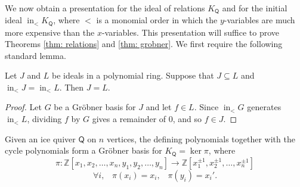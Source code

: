 \documentclass[ALCO,published]{cedram}
\numberwithin{equation}{section}
\DeclareMathOperator{\In}{\mathrm{in}}
\newcommand{\1}{^{-1}}
\def\ZZ{\mathbb{Z}}
\def\Q{\mathsf{Q}}
\begin{document}
\\ 
\indent We now obtain a presentation for the ideal of relations $K_\Q$ and for the initial ideal $\In_< K_\Q$, where $<$ is a monomial order in which the $y$-variables are much more expensive than the $x$-variables.
This presentation will suffice to prove Theorems \ref{thm: relations} and \ref{thm: grobner}. We first require the following standard lemma.
\begin{lem}\label{basislemma}
Let $J$ and $L$ be ideals in a polynomial ring. Suppose that $J \subseteq L$ and $\In_< J  = \In_< L$. Then $J = L$.
\end{lem}
\begin{proof}
Let $G$ be a Gr\"obner basis for $J$ and let $f \in L$. Since $\In_< G$ generates $\In_< L$, dividing $f$ by $G$ gives a remainder of $0$, and so $f \in J$.
\end{proof}
\begin{thm}\label{basisthm}
Given an ice quiver $\Q$ on $n$ vertices, the defining polynomials together with the cycle polynomials form a Gr\"obner basis for $K_\Q = \ker \pi$, where
\[ \pi :\ZZ[x_1,x_2,\dots,x_n,y_1,y_2,\dots,y_n]\longrightarrow \ZZ[x_1^{\pm1},x_2^{\pm1},\dots,x_n^{\pm1} ]\]
\[ \forall i, \;\;\; \pi(x_i) = x_i,\;\;\; \pi(y_i)=x_i'.\]
\end{thm}
\end{document}
